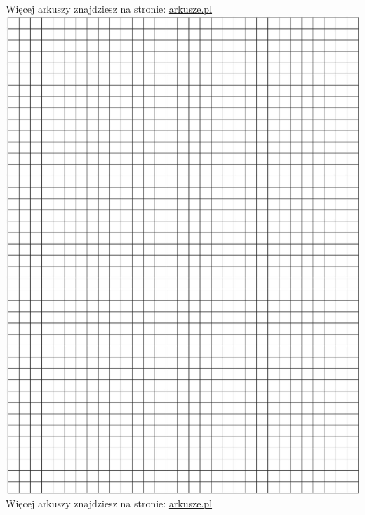 \documentclass[10pt]{article}
\begin{document}
Więcej arkuszy znajdziesz na stronie: \href{http://arkusze.pl}{arkusze.pl}\\
\includegraphics[max width=\textwidth, center]{2024_11_21_5abc0108fbbc287103ecg-10}\\
Więcej arkuszy znajdziesz na stronie: \href{http://arkusze.pl}{arkusze.pl}\\
\end{document}

